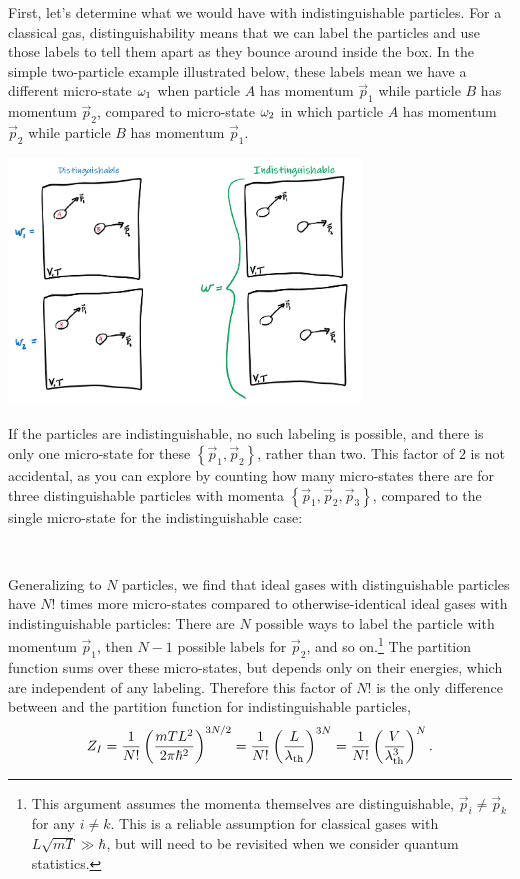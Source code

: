 First, let's determine what we would have with indistinguishable particles.
For a classical gas, distinguishability means that we can label the particles and use those labels to tell them apart as they bounce around inside the box.
In the simple two-particle example illustrated below, these labels mean we have a different micro-state $\omega_1$ when particle $A$ has momentum $\vec p_1$ while particle $B$ has momentum $\vec p_2$, compared to micro-state $\omega_2$ in which particle $A$ has momentum $\vec p_2$ while particle $B$ has momentum $\vec p_1$.
\begin{center}
  \includegraphics[width=0.7\textwidth]{figs/unit04_distinguish.pdf}
\end{center}
If the particles are indistinguishable, no such labeling is possible, and there is only one micro-state for these $\left\{\vec p_1, \vec p_2\right\}$, rather than two.
This factor of $2$ is not accidental, as you can explore by counting how many micro-states there are for three distinguishable particles with momenta $\left\{\vec p_1, \vec p_2, \vec p_3\right\}$, compared to the single micro-state for the indistinguishable case:
\begin{mdframed}
  \ \\[75 pt] %
\end{mdframed}

Generalizing to $N$ particles, we find that ideal gases with distinguishable particles have $N!$ times more micro-states compared to otherwise-identical ideal gases with indistinguishable particles: There are $N$ possible ways to label the particle with momentum $\vec{p}_1$, then $N - 1$ possible labels for $\vec{p}_2$, and so on.\footnote{This argument assumes the momenta themselves are distinguishable, $\vec{p}_i \neq \vec{p}_k$ for any $i \neq k$.  This is a reliable assumption for classical gases with $L\sqrt{mT} \gg \hbar$, but will need to be revisited when we consider quantum statistics.}
The partition function sums over these micro-states, but depends only on their energies, which are independent of any labeling.
Therefore this factor of $N!$ is the only difference between  and the partition function for indistinguishable particles,
\begin{equation}
  \label{eq:ideal_indis}
  Z_I = \frac{1}{N!} \left(\frac{mTL^2}{2\pi\hbar^2}\right)^{3N / 2} = \frac{1}{N!} \left(\frac{L}{\lambda_{\mathrm{th}}}\right)^{3N} = \frac{1}{N!} \left(\frac{V}{\lambda_{\mathrm{th}}^3}\right)^N.
\end{equation}



